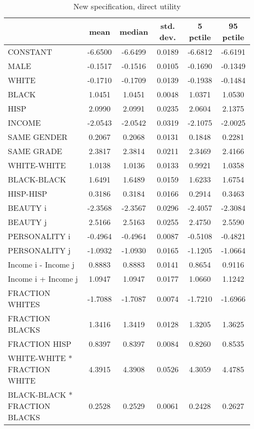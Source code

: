 \documentclass[12pt,letterpaper]{article}
\begin{document}
\begin{small}
\begin{table}[ht]
\caption{New specification, direct utility}
\centering
\begin{tabular}{l|ccccc}
  \hline
 & mean & median & std. dev. & 5 pctile & 95 pctile \\ 
  \hline
CONSTANT & -6.6500 & -6.6499 & 0.0189 & -6.6812 & -6.6191 \\ 
  MALE & -0.1517 & -0.1516 & 0.0105 & -0.1690 & -0.1349 \\ 
  WHITE & -0.1710 & -0.1709 & 0.0139 & -0.1938 & -0.1484 \\ 
  BLACK & 1.0451 & 1.0451 & 0.0048 & 1.0371 & 1.0530 \\ 
  HISP & 2.0990 & 2.0991 & 0.0235 & 2.0604 & 2.1375 \\ 
  INCOME & -2.0543 & -2.0542 & 0.0319 & -2.1075 & -2.0025 \\ 
  SAME GENDER & 0.2067 & 0.2068 & 0.0131 & 0.1848 & 0.2281 \\ 
  SAME GRADE & 2.3817 & 2.3814 & 0.0211 & 2.3469 & 2.4166 \\ 
  WHITE-WHITE & 1.0138 & 1.0136 & 0.0133 & 0.9921 & 1.0358 \\ 
  BLACK-BLACK & 1.6491 & 1.6489 & 0.0159 & 1.6233 & 1.6754 \\ 
  HISP-HISP & 0.3186 & 0.3184 & 0.0166 & 0.2914 & 0.3463 \\ 
  BEAUTY i & -2.3568 & -2.3567 & 0.0296 & -2.4057 & -2.3084 \\ 
  BEAUTY j & 2.5166 & 2.5163 & 0.0255 & 2.4750 & 2.5590 \\ 
  PERSONALITY i & -0.4964 & -0.4964 & 0.0087 & -0.5108 & -0.4821 \\ 
  PERSONALITY j & -1.0932 & -1.0930 & 0.0165 & -1.1205 & -1.0664 \\ 
  Income i - Income j & 0.8883 & 0.8883 & 0.0141 & 0.8654 & 0.9116 \\ 
  Income i + Income j & 1.0947 & 1.0947 & 0.0177 & 1.0660 & 1.1242 \\ 
  FRACTION WHITES & -1.7088 & -1.7087 & 0.0074 & -1.7210 & -1.6966 \\ 
  FRACTION BLACKS & 1.3416 & 1.3419 & 0.0128 & 1.3205 & 1.3625 \\ 
  FRACTION HISP & 0.8397 & 0.8397 & 0.0084 & 0.8260 & 0.8535 \\ 
  WHITE-WHITE * FRACTION WHITE & 4.3915 & 4.3908 & 0.0526 & 4.3059 & 4.4785 \\ 
  BLACK-BLACK * FRACTION BLACKS & 0.2528 & 0.2529 & 0.0061 & 0.2428 & 0.2627 \\ 

\end{tabular}
\end{table}
\end{small}
\end{document}

